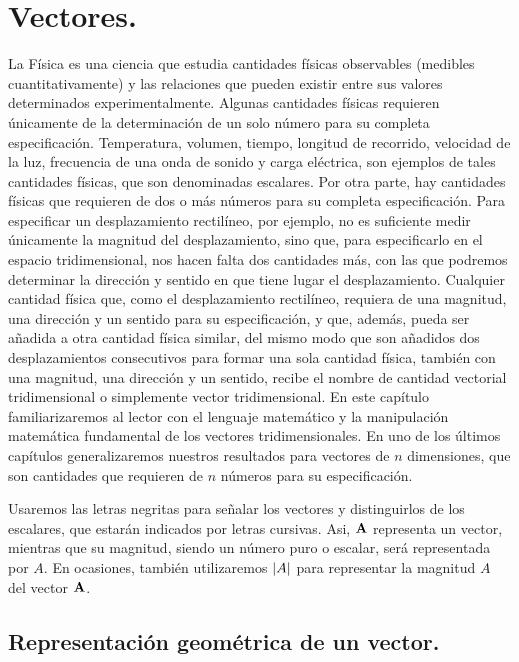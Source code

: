 \chapter{Vectores.}

La Física es una ciencia que estudia cantidades físicas observables (medibles cuantitativamente) y las relaciones que pueden existir entre sus valores determinados experimentalmente. Algunas cantidades físicas requieren únicamente de la determinación de un solo número para su completa especificación. Temperatura, volumen, tiempo, longitud de recorrido, velocidad de la luz, frecuencia de una onda de sonido y carga eléctrica, son ejemplos de tales cantidades físicas, que son denominadas escalares. Por otra parte, hay cantidades físicas que requieren de dos o más números para su completa especificación. Para especificar un desplazamiento rectilíneo, por ejemplo, no es suficiente medir únicamente la magnitud del desplazamiento, sino que, para especificarlo en el espacio tridimensional, nos hacen falta dos cantidades más, con las que podremos determinar la dirección y sentido en que tiene lugar el desplazamiento. Cualquier cantidad física que, como el desplazamiento rectilíneo, requiera de una magnitud, una dirección y un sentido para su especificación, y que, además, pueda ser añadida a otra cantidad física similar, del mismo modo que son añadidos dos 
desplazamientos consecutivos para formar una sola cantidad física, también con una magnitud, una dirección y un sentido, recibe el nombre de cantidad vectorial tridimensional o simplemente vector tridimensional. En este capítulo familiarizaremos al lector con el lenguaje matemático y la manipulación matemática fundamental de los vectores tridimensionales. En uno de los últimos capítulos generalizaremos nuestros resultados para vectores de $n$ dimensiones, que son cantidades que requieren de $n$ números para su especificación. 
\par
Usaremos las letras negritas para señalar los vectores y distinguirlos de los escalares, que estarán indicados por letras cursivas. Asi, $\vb{A}$ representa un vector, mientras que su magnitud, siendo un número puro o escalar, será representada por $A$. En ocasiones, también utilizaremos $\abs{A}$ para representar la magnitud $A$ del vector $\vb{A}$.

\section{Representación geométrica de un vector.} 

